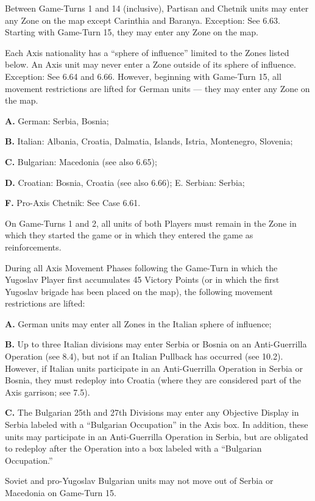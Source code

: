  Between Game-Turns 1 and 14 (inclusive), Partisan and Chetnik units may enter any Zone on the map except Carinthia and Baranya. Exception: See 6.63. Starting with Game-Turn 15, they may enter any Zone on the map.

 Each Axis nationality has a ``sphere of influence'' limited to the Zones listed below. An Axis unit may never enter a Zone outside of its sphere of influence. Exception: See 6.64 and 6.66. However, beginning with Game-Turn 15, all movement restrictions are lifted for German units — they may enter any Zone on the map.

\textbf{A.} German: Serbia, Bosnia;

\textbf{B.} Italian: Albania, Croatia, Dalmatia, Islands, Istria, Montenegro, Slovenia;

\textbf{C.} Bulgarian: Macedonia (see also 6.65);

\textbf{D.} Croatian: Bosnia, Croatia (see also 6.66); E. Serbian: Serbia;

\textbf{F.} Pro-Axis Chetnik: See Case 6.61.

 On Game-Turns 1 and 2, all units of both Players must remain in the Zone in which they started the game or in which they entered the game as reinforcements.

 During all Axis Movement Phases following the Game-Turn in which the Yugoslav Player first accumulates 45 Victory Points (or in which the first Yugoslav brigade has been placed on the map), the following movement restrictions are lifted:

\textbf{A.} German units may enter all Zones in the Italian sphere of influence;

\textbf{B.} Up to three Italian divisions may enter Serbia or Bosnia on an Anti-Guerrilla Operation (see 8.4), but not if an Italian Pullback has occurred (see 10.2). However, if Italian units participate in an Anti-Guerrilla Operation in Serbia or Bosnia, they must redeploy into Croatia (where they are considered part of the Axis garrison; see 7.5).

\textbf{C.} The Bulgarian 25th and 27th Divisions may enter any Objective Display in Serbia labeled with a ``Bulgarian Occupation'' in the Axis box. In addition, these units may participate in an Anti-Guerrilla Operation in Serbia, but are obligated to redeploy after the Operation into a box labeled with a ``Bulgarian Occupation.''

 Soviet and pro-Yugoslav Bulgarian units may not move out of Serbia
or Macedonia on Game-Turn 15.

